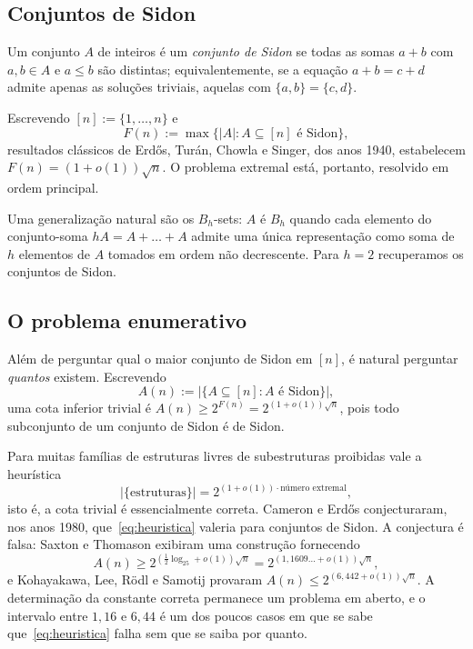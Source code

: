 \documentclass[11pt,a4paper]{article}
\theoremstyle{definition}
\theoremstyle{remark}
\begin{document}
\subsection{Conjuntos de Sidon}

Um conjunto \(A\) de inteiros é um \emph{conjunto de Sidon} se todas as
somas \(a+b\) com \(a,b\in A\) e \(a\leq b\) são distintas;
equivalentemente, se a equação \(a+b=c+d\) admite apenas as soluções
triviais, aquelas com \(\{a,b\}=\{c,d\}\).

Escrevendo \([n]:=\{1,\dots,n\}\) e
\[
  F(n):=\max\{|A|:A\subseteq[n]\text{ é Sidon}\},
\]
resultados clássicos de Erdős, Turán, Chowla e Singer, dos anos 1940,
estabelecem \(F(n)=(1+o(1))\sqrt n\). O problema extremal está, portanto,
resolvido em ordem principal.

Uma generalização natural são os \(B_h\)-sets: \(A\) é \(B_h\) quando
cada elemento do conjunto-soma \(hA=A+\dots+A\) admite uma única
representação como soma de \(h\) elementos de \(A\) tomados em ordem não
decrescente. Para \(h=2\) recuperamos os conjuntos de Sidon.

\subsection{O problema enumerativo}

Além de perguntar qual o maior conjunto de Sidon em \([n]\), é natural
perguntar \emph{quantos} existem. Escrevendo
\[
  A(n):=\bigl|\{A\subseteq[n]:A\text{ é Sidon}\}\bigr|,
\]
uma cota inferior trivial é \(A(n)\geq2^{F(n)}=2^{(1+o(1))\sqrt n}\),
pois todo subconjunto de um conjunto de Sidon é de Sidon.

Para muitas famílias de estruturas livres de subestruturas proibidas
vale a heurística
\begin{equation}
  \label{eq:heuristica}
  |\{\text{estruturas}\}|
  =
  2^{(1+o(1))\cdot\text{número extremal}},
\end{equation}
isto é, a cota trivial é essencialmente correta. Cameron e Erdős
conjecturaram, nos anos 1980, que~\eqref{eq:heuristica} valeria para
conjuntos de Sidon. A conjectura é falsa: Saxton e Thomason exibiram uma
construção fornecendo
\[
  A(n)\geq2^{(\frac12\log_25+o(1))\sqrt n}
  =
  2^{(1{,}1609\ldots+o(1))\sqrt n},
\]
e Kohayakawa, Lee, Rödl e Samotij provaram
\(A(n)\leq2^{(6{,}442+o(1))\sqrt n}\). A determinação da constante
correta permanece um problema em aberto, e o intervalo entre
\(1{,}16\) e \(6{,}44\) é um dos poucos casos em que se sabe
que~\eqref{eq:heuristica} falha sem que se saiba por quanto.
\end{document}
